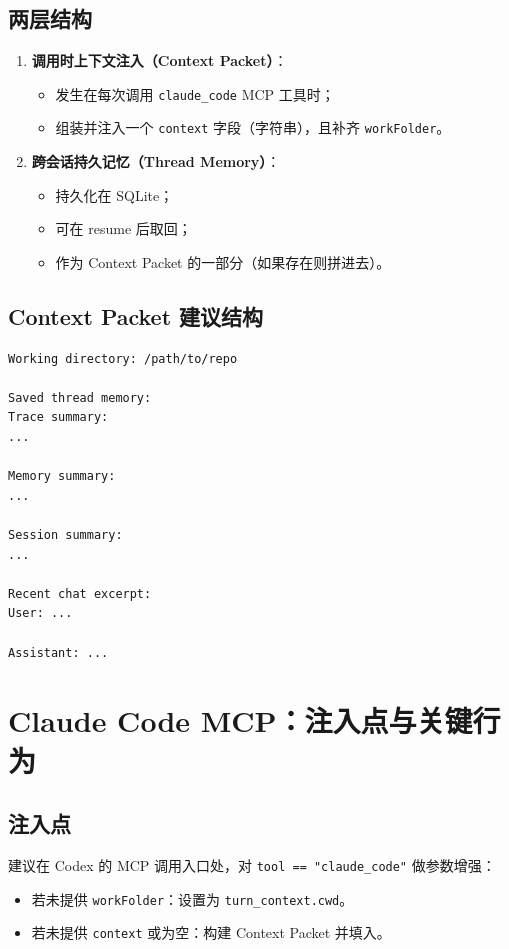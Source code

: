 \documentclass[UTF8,11pt]{ctexart}
\begin{document}
\subsection{两层结构}
\begin{enumerate}
  \item \textbf{调用时上下文注入（Context Packet）}：
    \begin{itemize}[nosep]
      \item 发生在每次调用 \texttt{claude\_code} MCP 工具时；
      \item 组装并注入一个 \texttt{context} 字段（字符串），且补齐 \texttt{workFolder}。
    \end{itemize}
  \item \textbf{跨会话持久记忆（Thread Memory）}：
    \begin{itemize}[nosep]
      \item 持久化在 SQLite；
      \item 可在 resume 后取回；
      \item 作为 Context Packet 的一部分（如果存在则拼进去）。
    \end{itemize}
\end{enumerate}

\subsection{Context Packet 建议结构}
\begin{lstlisting}
Working directory: /path/to/repo

Saved thread memory:
Trace summary:
...

Memory summary:
...

Session summary:
...

Recent chat excerpt:
User: ...

Assistant: ...
\end{lstlisting}

\section{Claude Code MCP：注入点与关键行为}
\subsection{注入点}
建议在 Codex 的 MCP 调用入口处，对 \texttt{tool == "claude\_code"} 做参数增强：
\begin{itemize}[nosep]
  \item 若未提供 \texttt{workFolder}：设置为 \texttt{turn\_context.cwd}。
  \item 若未提供 \texttt{context} 或为空：构建 Context Packet 并填入。
\end{itemize}
\end{document}

